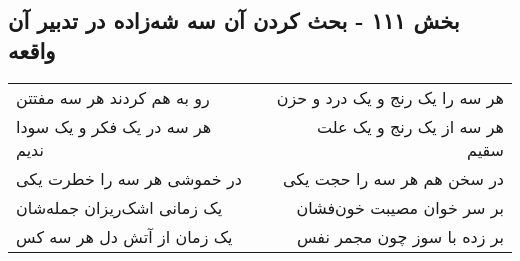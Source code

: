 \begin{center}
\section*{بخش ۱۱۱ - بحث کردن آن سه شه‌زاده در تدبیر آن واقعه}
\label{sec:sh111}
\begin{longtable}{l p{0.5cm} r}
رو به هم کردند هر سه مفتتن
&&
هر سه را یک رنج و یک درد و حزن
\\
هر سه در یک فکر و یک سودا ندیم
&&
هر سه از یک رنج و یک علت سقیم
\\
در خموشی هر سه را خطرت یکی
&&
در سخن هم هر سه را حجت یکی
\\
یک زمانی اشک‌ریزان جمله‌شان
&&
بر سر خوان مصیبت خون‌فشان
\\
یک زمان از آتش دل هر سه کس
&&
بر زده با سوز چون مجمر نفس
\\
\end{longtable}
\end{center}
